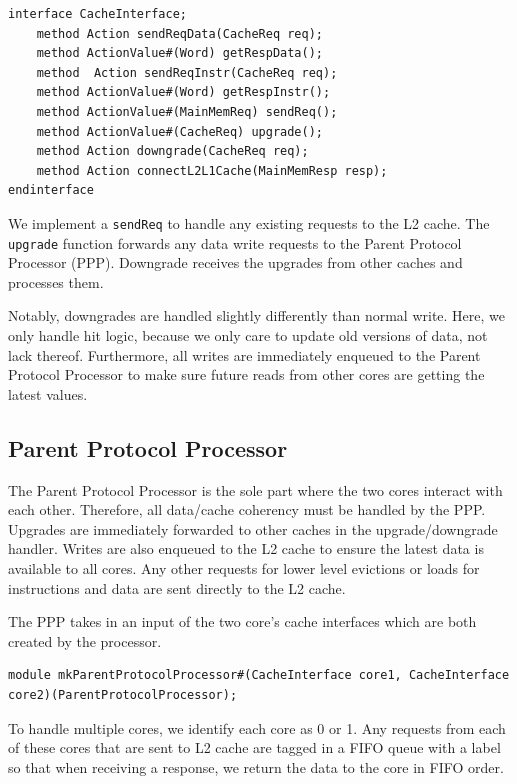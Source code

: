 \documentclass{article}
\begin{document}
\begin{lstlisting}
interface CacheInterface;
    method Action sendReqData(CacheReq req);
    method ActionValue#(Word) getRespData();
    method  Action sendReqInstr(CacheReq req);
    method ActionValue#(Word) getRespInstr();
    method ActionValue#(MainMemReq) sendReq();
    method ActionValue#(CacheReq) upgrade();
    method Action downgrade(CacheReq req);
    method Action connectL2L1Cache(MainMemResp resp);
endinterface
\end{lstlisting}

We implement a \lstinline{sendReq} to handle any existing requests to the L2 cache. The \lstinline|upgrade| function forwards any data write requests to the Parent Protocol Processor (PPP). Downgrade receives the upgrades from other caches and processes them. 

Notably, downgrades are handled slightly differently than normal write. Here, we only handle hit logic, because we only care to update old versions of data, not lack thereof. Furthermore, all writes are immediately enqueued to the Parent Protocol Processor to make sure future reads from other cores are getting the latest values.

\subsection{Parent Protocol Processor}

The Parent Protocol Processor is the sole part where the two cores interact with each other. Therefore, all data/cache coherency must be handled by the PPP. Upgrades are immediately forwarded to other caches in the upgrade/downgrade handler. Writes are also enqueued to the L2 cache to ensure the latest data is available to all cores. Any other requests for lower level evictions or loads for instructions and data are sent directly to the L2 cache. 

The PPP takes in an input of the two core's cache interfaces which are both created by the processor. 

\begin{lstlisting}
module mkParentProtocolProcessor#(CacheInterface core1, CacheInterface core2)(ParentProtocolProcessor);
\end{lstlisting}

To handle multiple cores, we identify each core as 0 or 1. Any requests from each of these cores that are sent to L2 cache are tagged in a FIFO queue with a label so that when receiving a response, we return the data to the core in FIFO order.
\end{document}
